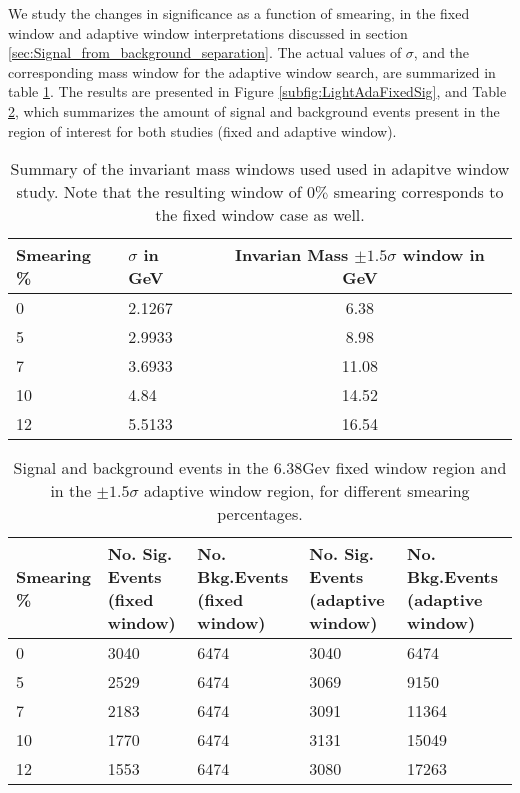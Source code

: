 We study the changes in significance as a function of smearing, in the fixed window and adaptive window interpretations discussed in section \ref{sec:Signal_from_background_separation}. The actual values of \(\sigma\), and the corresponding mass window for the adaptive window search, are summarized in table \ref{table:LightAdaSigmas}. The results are presented in Figure \ref{subfig:LightAdaFixedSig}, and Table \ref{table:LightNumSigBkg}, which summarizes the amount of signal and background events present in the region of interest for both studies (fixed and adaptive window).
\begin{table}[h]
\centering
\begin{tabular}{|p{2cm}|p{2cm}|c|}
 \hline
Smearing \%  & $\sigma$ in GeV & Invarian Mass $\pm 1.5\sigma$ window  in GeV \\
\hline
0 & 2.1267 & 6.38 \\
5 & 2.9933 & 8.98 \\
7 & 3.6933 & 11.08 \\
10 & 4.84 & 14.52 \\
12 & 5.5133 & 16.54 \\
 \hline
\end{tabular}
\caption{Summary of the invariant mass windows used used in adapitve window study. Note that the resulting window of $0\%$ smearing corresponds to the fixed window case as well.}
\label{table:LightAdaSigmas}
\end{table}

\begin{table}[h!]
\centering
\begin{tabular}{|p{2cm}|p{3cm}|p{3cm}|p{3cm}|p{3cm}|}
 \hline
Smearing \%  & No. Sig. Events (fixed window) & No. Bkg.Events (fixed window) & No. Sig. Events (adaptive window) & No. Bkg.Events (adaptive window)  \\
\hline
0 & 3040 & 6474 & 3040 & 6474 \\
5 & 2529 & 6474 & 3069 & 9150 \\
7 & 2183 & 6474 & 3091 & 11364 \\
10 & 1770 & 6474 & 3131 & 15049 \\
12 & 1553 & 6474 & 3080 & 17263 \\
 \hline
\end{tabular}
\caption{Signal and background events in the 6.38Gev fixed window region and in the $\pm 1.5\sigma$ adaptive window region, for different smearing percentages.}
\label{table:LightNumSigBkg}
\end{table}

